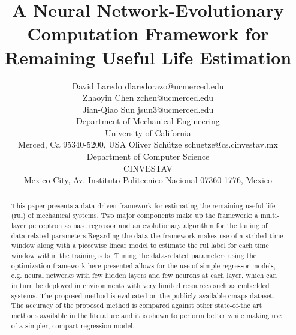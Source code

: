\documentclass[twoside,11pt]{article}
\begin{document}
\title{A Neural Network-Evolutionary Computation Framework for Remaining Useful Life Estimation}


\glsunsetall

\author{\name David Laredo \email dlaredorazo@ucmerced.edu \\
			 \name Zhaoyin Chen \email zchen@ucmerced.edu \\
			 \name Jian-Qiao Sun \email jsun3@ucmerced.edu \\
       \addr Department of Mechanical Engineering\\
       University of California\\
       Merced, Ca 95340-5200, USA
       \AND
       \name Oliver Sch\"{u}tze \email schuetze@cs.cinvestav.mx \\
       \addr Department of Computer Science\\
       CINVESTAV\\
       Mexico City, Av. Instituto Politecnico Nacional 07360-1776, Mexico}

\editor{}

\maketitle

\begin{abstract}%
This paper presents a data-driven framework for estimating the remaining useful life (\gls{rul}) of mechanical systems. Two major components make up the framework: a multi-layer perceptron as base regressor and an evolutionary algorithm for the tuning of data-related parameters.Regarding the data the framework makes use of a strided time window along with a piecewise linear model to estimate the \gls{rul} label for each time window within the training sets. Tuning the data-related parameters using the optimization framework here presented allows for the use of simple regressor models, e.g. neural networks with few hidden layers and few neurons at each layer, which can in turn be deployed in environments with very limited resources such as embedded systems. The proposed method is evaluated on the publicly available \gls{cmaps} dataset. The accuracy of the proposed method is compared against other state-of-the art methods available in the literature and it is shown to perform better while making use of a simpler, compact regression model.
\end{abstract}
\end{document}
